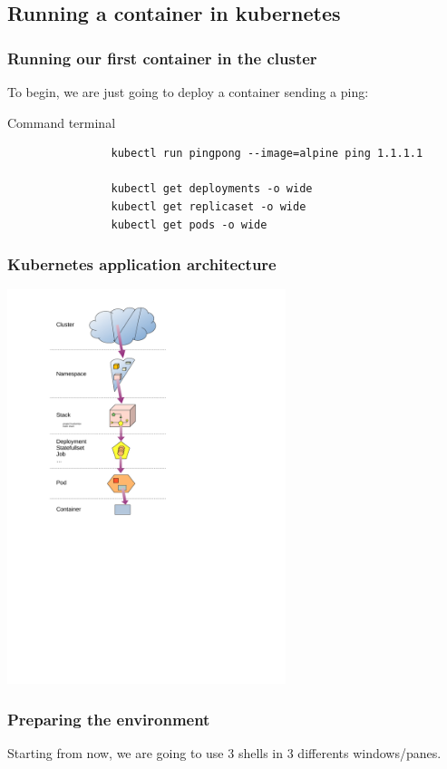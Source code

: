 \subsection{Running a container in kubernetes}	
		
	\begin{frame}[fragile]
		\frametitle{Running our first container in the cluster}
	
		To begin, we are just going to deploy a container sending a ping:
		\begin{block}{Command terminal}
			\begin{verbatim}
				kubectl run pingpong --image=alpine ping 1.1.1.1
				
				kubectl get deployments -o wide
				kubectl get replicaset -o wide
				kubectl get pods -o wide
			\end{verbatim}
		\end{block}
	\end{frame}
	
	\begin{frame}
		\frametitle{Kubernetes application architecture}
		
		\begin{center}
		\includegraphics[height=11.5cm]{../../../resources/color/fromCluster2container.pdf}
		\end{center}
		
	\end{frame}		

	\begin{frame}
		\frametitle{Preparing the environment}
		
		Starting from now, we are going to use 3 shells in 3 differents windows/panes.
		
	\end{frame}		

